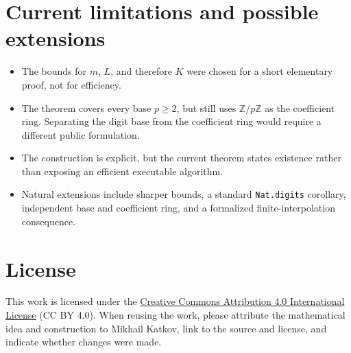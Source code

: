 \documentclass[11pt]{article}
\newcommand{\Z}{\mathbb{Z}}
\newcommand{\Zmod}[1]{\Z/#1\Z}
\begin{document}
\section{Current limitations and possible extensions}

\begin{itemize}[leftmargin=*]
  \item The bounds for $m$, $L$, and therefore $K$ were chosen for a short
        elementary proof, not for efficiency.
  \item The theorem covers every base $p\ge2$, but still uses $\Zmod p$ as the
        coefficient ring. Separating the digit base from the coefficient ring
        would require a different public formulation.
  \item The construction is explicit, but the current theorem states
        existence rather than exposing an efficient executable algorithm.
  \item Natural extensions include sharper bounds, a standard
        \texttt{Nat.digits} corollary, independent base and coefficient ring,
        and a formalized finite-interpolation consequence.
\end{itemize}

\section*{License}

This work is licensed under the
\href{https://creativecommons.org/licenses/by/4.0/}{Creative Commons
Attribution 4.0 International License} (CC BY 4.0). When reusing the work,
please attribute the mathematical idea and construction to Mikhail Katkov,
link to the source and license, and indicate whether changes were made.
\end{document}
